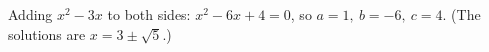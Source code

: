 Adding $x^2-3x$ to both sides: $\boxed{x^2-6x+4=0}$, so $\boxed{a=1,\ b=-6,\ c=4}$. (The solutions are $x=3\pm\sqrt5$.)
